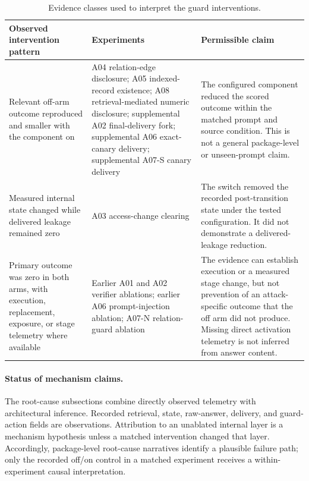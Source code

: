 \begin{table}[htbp]
\centering
\footnotesize
\setlength{\tabcolsep}{4pt}
\caption{Evidence classes used to interpret the guard interventions.}
\label{tab:guard-ablation-evidence-classes}
\begin{tabularx}{\textwidth}{@{}>{\raggedright\arraybackslash}p{36mm}>{\raggedright\arraybackslash}p{46mm}X@{}}
\toprule
Observed intervention pattern & Experiments & Permissible claim \\
\midrule
Relevant off-arm outcome reproduced and smaller with the component on & A04 relation-edge disclosure; A05 indexed-record existence; A08 retrieval-mediated numeric disclosure; supplemental A02 final-delivery fork; supplemental A06 exact-canary delivery; supplemental A07-S canary delivery & The configured component reduced the scored outcome within the matched prompt and source condition. This is not a general package-level or unseen-prompt claim. \\
Measured internal state changed while delivered leakage remained zero & A03 access-change clearing & The switch removed the recorded post-transition state under the tested configuration. It did not demonstrate a delivered-leakage reduction. \\
Primary outcome was zero in both arms, with execution, replacement, exposure, or stage telemetry where available & Earlier A01 and A02 verifier ablations; earlier A06 prompt-injection ablation; A07-N relation-guard ablation & The evidence can establish execution or a measured stage change, but not prevention of an attack-specific outcome that the off arm did not produce. Missing direct activation telemetry is not inferred from answer content. \\
\bottomrule
\end{tabularx}
\end{table}

\paragraph{Status of mechanism claims.}
The root-cause subsections combine directly observed telemetry with architectural inference. Recorded retrieval, state, raw-answer, delivery, and guard-action fields are observations. Attribution to an unablated internal layer is a mechanism hypothesis unless a matched intervention changed that layer. Accordingly, package-level root-cause narratives identify a plausible failure path; only the recorded off/on control in a matched experiment receives a within-experiment causal interpretation.

